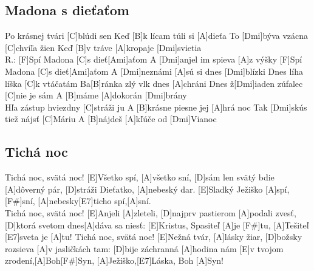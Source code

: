 \documentclass[10pt]{article}
\begin{document}
\begin{Large}
\begin{minipage}{\textwidth}
\subsection{Madona s dieťaťom}
\begin{multicols}{2}
\begin{guitar}
	[Dmi]Po krásnej tvári [C]blúdi sen
	Keď [B]k lícam túli si [A]dieťa
	To [Dmi]býva vzácna [C]chvíľa žien
	Keď [B]v tráve [A]kropaje [Dmi]svietia
	\\
	R.: [F]Spí Madona [C]s dieť[Ami]aťom
	A [Dmi]anjel im spieva [A]z výšky
	[F]Spí Madona [C]s dieť[Ami]aťom
	A [Dmi]neznámi [A]sú si dnes [Dmi]blízki
	\columnbreak
	[Dmi]Dnes líha líška [C]k vtáčatám
	Ba[B]ránka zlý vlk dnes [A]chráni
	Dnes ž[Dmi]iaden zúfalec [C]nie je sám
	A [B]máme [A]dokorán [Dmi]brány
	\\
	[Dmi]Hľa zástup hviezdny [C]stráži ju
	A [B]krásne piesne jej [A]hrá noc
	Tak [Dmi]skús tiež nájsť [C]Máriu
	A [B]nájdeš [A]kľúče od [Dmi]Vianoc
\end{guitar}
\end{multicols}
\end{minipage}

\begin{minipage}{\textwidth}
\subsection{Tichá noc}
\begin{multicols}{2}
\begin{guitar}
	[A]Tichá noc, svätá noc!
	[E]Všetko spí, [A]všetko sní,
	[D]sám len svätý bdie [A]dôverný pár,
	[D]stráži Dieťatko, [A]nebeský dar.
	[E]Sladký Ježiško [A]spí,[F#]sní,
	[A]nebesky[E7]ticho spí,[A]sní.
	\\
	[A]Tichá noc, svätá noc!
	[E]Anjeli [A]zleteli,
	[D]najprv pastierom [A]podali zvesť,
	[D]ktorá svetom dnes[A]dáva sa niesť:
	[E]Kristus, Spasiteľ [A]je [F#]tu,
	[A]Tešiteľ [E7]sveta je [A]tu!
	\columnbreak
	[A]Tichá noc, svätá noc!
	[E]Nežná tvár, [A]lásky žiar,
	[D]božsky rozsieva [A]v jasličkách tam:
	[D]bije záchranná [A]hodina nám
	[E]v tvojom zrodení,[A]Boh[F#]Syn,
	[A]Ježiško,[E7]Láska, Boh [A]Syn!
	
\end{guitar}
\end{multicols}
\end{minipage}

\begin{minipage}{\textwidth}

\end{minipage}
\end{Large}
\end{document}
